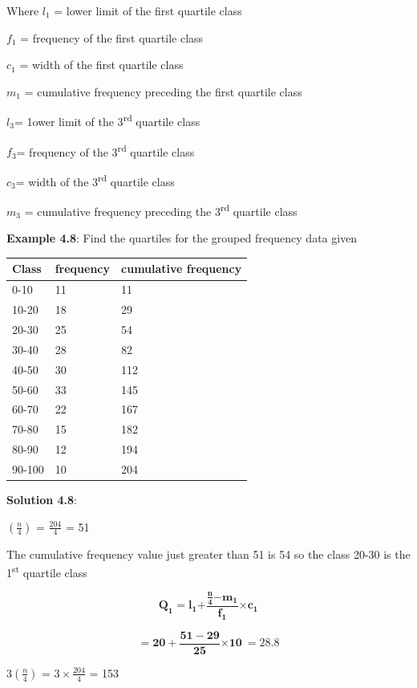 \documentclass[
]{book}
\begin{document}
Where \(l_{1}\) = lower limit of the first quartile class

\(f_{1}\) = frequency of the first quartile class

\(c_{1}\) = width of the first quartile class

\(m_{1}\) = cumulative frequency preceding the first quartile class

\(l_{3}\)= 1ower limit of the 3\textsuperscript{rd} quartile class

\(f_{3}\)= frequency of the 3\textsuperscript{rd} quartile class

\(c_{3}\)= width of the 3\textsuperscript{rd} quartile class

\(m_{3}\) = cumulative frequency preceding the 3\textsuperscript{rd} quartile class

\textbf{Example 4.8}: Find the quartiles for the grouped frequency data given

\begin{longtable}[]{@{}lll@{}}
\toprule
\textbf{Class} & \textbf{frequency} & \textbf{cumulative frequency} \\
\midrule
\endhead
0-10 & 11 & 11 \\
10-20 & 18 & 29 \\
20-30 & 25 & 54 \\
30-40 & 28 & 82 \\
40-50 & 30 & 112 \\
50-60 & 33 & 145 \\
60-70 & 22 & 167 \\
70-80 & 15 & 182 \\
80-90 & 12 & 194 \\
90-100 & 10 & 204 \\
\bottomrule
\end{longtable}

\textbf{Solution 4.8}:

\(\left( \frac{n}{4} \right)\) = \(\frac{204}{4}\) = 51

The cumulative frequency value just greater than 51 is 54 so the class
20-30 is the 1\textsuperscript{st} quartile class

\[\mathbf{Q}_{\mathbf{1}}\mathbf{=}\mathbf{l}_{\mathbf{1}}\mathbf{+}\frac{\frac{\mathbf{n}}{\mathbf{4}}\mathbf{-}\mathbf{m}_{\mathbf{1}}}{\mathbf{f}_{\mathbf{1}}}\mathbf{\times}\mathbf{c}_{\mathbf{1}}\]

\[\mathbf{= 20 +}\frac{\mathbf{51 - 29}}{\mathbf{25}}\mathbf{\times 10\  = 28.8}\]

\(3\left( \frac{n}{4} \right)\) = \(3 \times \frac{204}{4}\) = 153
\end{document}
